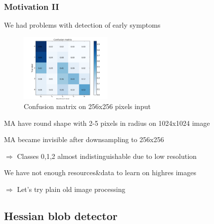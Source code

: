 \begin{frame}\frametitle{Motivation II}
\vspace{-0.7cm}
\par We had problems with detection of early symptoms
\par
\begin{figure}
\begin{center}
\vspace{-5pt}
\includegraphics[width=0.4\textwidth]{pics/submission_21_inner_squares_conv5_maxout.png}
\caption{Confusion matrix on 256x256 pixels input}
\vspace{-15pt}
\end{center}
\end{figure}

\par MA have round shape with 2-5 pixels in radius on 1024x1024 image 
\par MA became invisible after downsampling to 256x256
\par $\Rightarrow$ Classes 0,1,2 almost indistinguishable due to low resolution
\par We have not enough resources\&data to learn on highres images
\par $\Rightarrow$ Let's try plain old image processing
\end{frame}

\subsection{Hessian blob detector} 
\small

